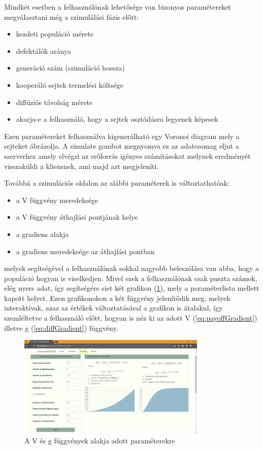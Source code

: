 Mindkét esetben a felhasználónak lehetősége van bizonyos paramétereket megválasztani még a szimulálási fázis előtt:
\begin{itemize}[noitemsep]
	\item kezdeti populáció mérete
	\item defektálók aránya 
	\item generáció szám (szimuláció hossza)
	\item kooperáló sejtek termelési költsége 
	\item diffúziós távolság mérete
	\item akarja-e a felhasználó, hogy a sejtek osztódásra legyenek képesek
\end{itemize}
Ezen paramétereket felhasználva kigenerálható egy Voronoi diagram mely a sejteket ábrázolja. A simulate gombot megnyomva ez az adatcsomag eljut a szerverhez amely elvégzi az erőforrás igényes számításokat melynek eredményét visszaküldi a kliensnek, ami majd azt megjeleníti.

Továbbá a szimulációs oldalon az alábbi paraméterek is változtathatóak:
\begin{itemize}[noitemsep]
	\item a V függvény meredeksége
	\item a V függvény áthajlási pontjának helye
	\item a gradiens alakja
	\item a gradiens meredeksége az áthajlási pontban
\end{itemize}
melyek segítségével a felhasználónak sokkal nagyobb beleszólása van abba, hogy a populáció hogyan is viselkedjen. Mivel ezek a felhasználónak csak puszta számok, elég nyers adat, így segítségére siet két grafikon (\ref{fig:SimulationFunctionDiagrams}), mely a paraméterlista mellett kapott helyet. Ezen grafikonokon a két függvény jelenítődik meg, melyek interaktívak, azaz az értékek változtatásával a grafikon is átalakul, így szemléltetve a felhasználó előtt, hogyan is néz ki az adott V (\ref{eq:payoffGradient}) illetve g (\ref{eq:diffGradient}) függvény.

\begin{figure}[ht!]
	\centering
	\includegraphics[width=90mm]{images/SimulationFunctionDiagrams.jpg}
	\caption{A V és g függvények alakja adott paraméterekre}
	\label{fig:SimulationFunctionDiagrams}
\end{figure}


